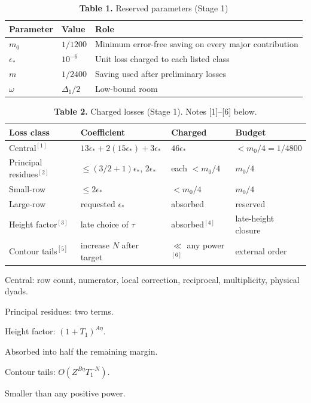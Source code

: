 \documentclass[11pt]{article}
\begin{document}
\begin{table}[H]\centering\small
\caption*{\textbf{Table 1.} Reserved parameters (Stage 1)}
\begin{tabular}{@{}lll@{}}\toprule
\textbf{Parameter} & \textbf{Value} & \textbf{Role}\\\midrule
$m_0$ & $1/1200$ & Minimum error-free saving on every major contribution\\
$\epsilon_*$ & $10^{-6}$ & Unit loss charged to each listed class\\
$m$ & $1/2400$ & Saving used after preliminary losses\\
$\omega$ & $\Delta_1/2$ & Low-bound room\\\bottomrule
\end{tabular}\end{table}

\begin{table}[H]\centering\small
\caption*{\textbf{Table 2.} Charged losses (Stage 1). Notes [1]--[6] below.}
\begin{tabular}{@{}llll@{}}\toprule
\textbf{Loss class} & \textbf{Coefficient} & \textbf{Charged} & \textbf{Budget}\\\midrule
Central$^{[1]}$ & $13\epsilon_*+2(15\epsilon_*)+3\epsilon_*$ & $46\epsilon_*$ & $<m_0/4=1/4800$\\
Principal residues$^{[2]}$ & $\le(3/2+1)\epsilon_*$, $2\epsilon_*$ & each $<m_0/4$ & $m_0/4$\\
Small-row & $\le 2\epsilon_*$ & $<m_0/4$ & $m_0/4$\\
Large-row & requested $\epsilon_*$ & absorbed & reserved\\
Height factor$^{[3]}$ & late choice of $\tau$ & absorbed$^{[4]}$ & late-height closure\\
Contour tails$^{[5]}$ & increase $N$ after target & $\ll$ any power$^{[6]}$ & external order\\\bottomrule
\end{tabular}\end{table}

\begin{enumerate}[label={[\arabic*]},leftmargin=2.2em,itemsep=0.1em,font=\small]\small
\item Central: row count, numerator, local correction, reciprocal, multiplicity, physical dyads.
\item Principal residues: two terms.
\item Height factor: $(1+T_1)^{A\eta}$.
\item Absorbed into half the remaining margin.
\item Contour tails: $O(Z^{B\eta}T_1^{-N})$.
\item Smaller than any positive power.
\end{enumerate}
\end{document}
